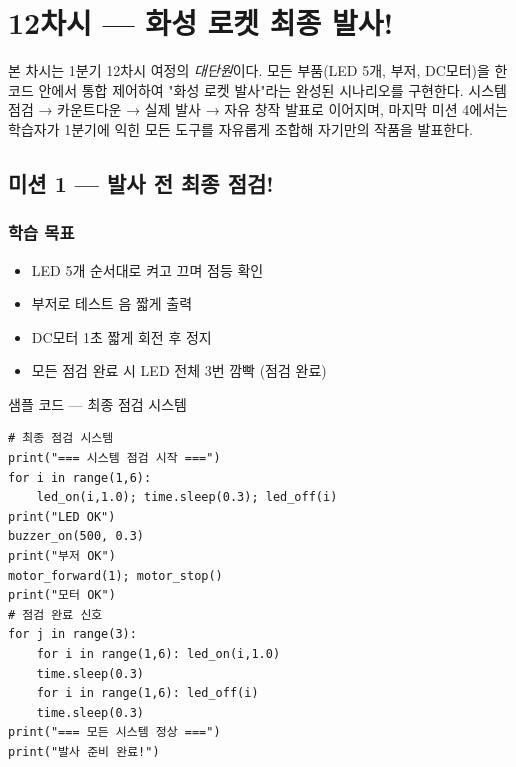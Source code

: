 \section{12차시 --- 화성 로켓 최종 발사!}
\label{sec:ch12}

본 차시는 1분기 12차시 여정의 \emph{대단원}이다. 모든 부품(LED 5개,
부저, DC모터)을 한 코드 안에서 통합 제어하여 "화성 로켓 발사"라는
완성된 시나리오를 구현한다. 시스템 점검 → 카운트다운 → 실제 발사 →
자유 창작 발표로 이어지며, 마지막 미션 4에서는 학습자가 1분기에 익힌
모든 도구를 자유롭게 조합해 자기만의 작품을 발표한다.

\subsection{미션 1 --- 발사 전 최종 점검!}
\label{subsec:ch12-m1}

\begin{storybox}
\end{storybox}

\subsubsection*{학습 목표}
\begin{itemize}[leftmargin=1.4em]
  \item LED 5개 순서대로 켜고 끄며 점등 확인
  \item 부저로 테스트 음 짧게 출력
  \item DC모터 1초 짧게 회전 후 정지
  \item 모든 점검 완료 시 LED 전체 3번 깜빡 (점검 완료)
\end{itemize}

\begin{labbox}{샘플 코드 --- 최종 점검 시스템}
\begin{verbatim}
# 최종 점검 시스템
print("=== 시스템 점검 시작 ===")
for i in range(1,6):
    led_on(i,1.0); time.sleep(0.3); led_off(i)
print("LED OK")
buzzer_on(500, 0.3)
print("부저 OK")
motor_forward(1); motor_stop()
print("모터 OK")
# 점검 완료 신호
for j in range(3):
    for i in range(1,6): led_on(i,1.0)
    time.sleep(0.3)
    for i in range(1,6): led_off(i)
    time.sleep(0.3)
print("=== 모든 시스템 정상 ===")
print("발사 준비 완료!")
\end{verbatim}
\end{labbox}


